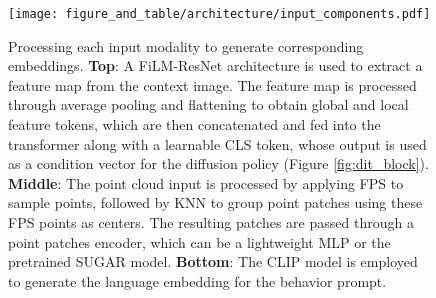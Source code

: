 
\begin{figure}[t]
    \centering
    \texttt{[image: figure\_and\_table/architecture/input\_components.pdf]}
    \caption{Processing each input modality to generate corresponding embeddings. \textbf{Top}: A FiLM-ResNet  architecture is used to extract a feature map from the context image. The feature map is processed through average pooling and flattening to obtain global and local feature tokens, which are then concatenated and fed into the transformer along with a learnable CLS token, whose output is used as a condition vector for the diffusion policy (Figure \ref{fig:dit_block}). \textbf{Middle}: The point cloud input is processed by applying FPS to sample points, followed by KNN to group point patches using these FPS points as centers. The resulting patches are passed through a point patches encoder, which can be a lightweight MLP or the pretrained SUGAR model. \textbf{Bottom}: The CLIP model is employed to generate the language embedding for the behavior prompt.} 
    \label{fig:input_components}
    \vspace{-0.5cm}
\end{figure}


